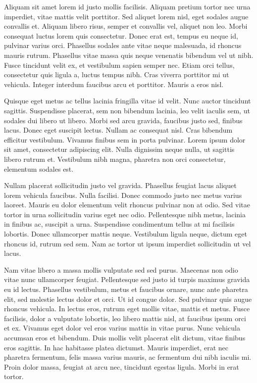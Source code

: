 \documentclass{article}
\begin{document}
Aliquam sit amet lorem id justo mollis facilisis. Aliquam pretium tortor nec urna imperdiet, vitae mattis velit porttitor. Sed aliquet lorem nisl, eget sodales augue convallis et. Aliquam libero risus, semper et convallis vel, aliquet non leo. Morbi consequat luctus lorem quis consectetur. Donec erat est, tempus eu neque id, pulvinar varius orci. Phasellus sodales ante vitae neque malesuada, id rhoncus mauris rutrum. Phasellus vitae massa quis neque venenatis bibendum vel ut nibh. Fusce tincidunt velit ex, et vestibulum sapien semper nec. Etiam orci tellus, consectetur quis ligula a, luctus tempus nibh. Cras viverra porttitor mi ut vehicula. Integer interdum faucibus arcu et porttitor. Mauris a eros nisl.

Quisque eget metus ac tellus lacinia fringilla vitae id velit. Nunc auctor tincidunt sagittis. Suspendisse placerat, sem non bibendum lacinia, leo velit iaculis sem, ut sodales dui libero ut libero. Morbi sed arcu gravida, faucibus justo sed, finibus lacus. Donec eget suscipit lectus. Nullam ac consequat nisl. Cras bibendum efficitur vestibulum. Vivamus finibus sem in porta pulvinar. Lorem ipsum dolor sit amet, consectetur adipiscing elit. Nulla dignissim neque nulla, ut sagittis libero rutrum et. Vestibulum nibh magna, pharetra non orci consectetur, elementum sodales est.

Nullam placerat sollicitudin justo vel gravida. Phasellus feugiat lacus aliquet lorem vehicula faucibus. Nulla facilisi. Donec commodo justo nec metus varius laoreet. Mauris eu dolor elementum velit rhoncus pulvinar non at odio. Sed vitae tortor in urna sollicitudin varius eget nec odio. Pellentesque nibh metus, lacinia in finibus ac, suscipit a urna. Suspendisse condimentum tellus at mi facilisis lobortis. Donec ullamcorper mattis neque. Vestibulum ligula neque, dictum eget rhoncus id, rutrum sed sem. Nam ac tortor ut ipsum imperdiet sollicitudin ut vel lacus.

Nam vitae libero a massa mollis vulputate sed sed purus. Maecenas non odio vitae nunc ullamcorper feugiat. Pellentesque sed justo id turpis maximus gravida eu id lectus. Phasellus vestibulum, metus et faucibus ornare, nunc ante pharetra elit, sed molestie lectus dolor et orci. Ut id congue dolor. Sed pulvinar quis augue rhoncus vehicula. In lectus eros, rutrum eget mollis vitae, mattis et metus. Fusce facilisis, dolor a vulputate lobortis, leo libero mattis nisl, at faucibus ipsum orci et ex. Vivamus eget dolor vel eros varius mattis in vitae purus. Nunc vehicula accumsan eros et bibendum. Duis mollis velit placerat elit dictum, vitae finibus eros sagittis. In hac habitasse platea dictumst. Mauris imperdiet, erat nec pharetra fermentum, felis massa varius mauris, ac fermentum dui nibh iaculis mi. Proin dolor massa, feugiat at arcu nec, tincidunt egestas ligula. Morbi in erat tortor.
\end{document}
